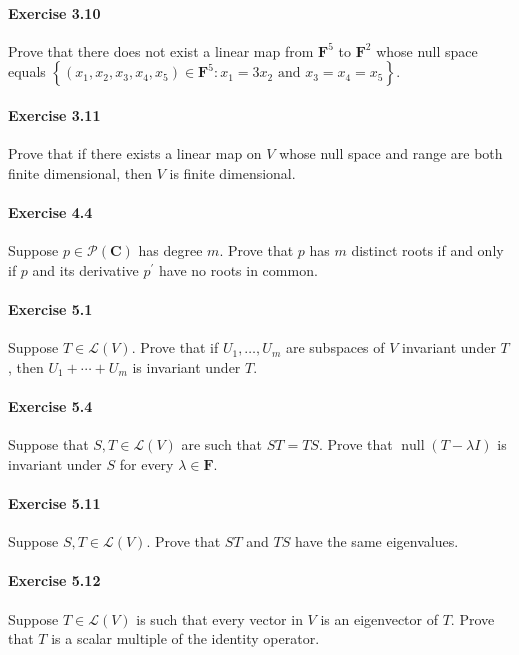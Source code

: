 \documentclass{article}
\begin{document}
\paragraph{Exercise 3.10} Prove that there does not exist a linear map from $\mathbf{F}^{5}$ to $\mathbf{F}^{2}$ whose null space equals $\left\{\left(x_{1}, x_{2}, x_{3}, x_{4}, x_{5}\right) \in \mathbf{F}^{5}: x_{1}=3 x_{2} \text { and } x_{3}=x_{4}=x_{5}\right\} .$

\paragraph{Exercise 3.11} Prove that if there exists a linear map on $V$ whose null space and range are both finite dimensional, then $V$ is finite dimensional.

\paragraph{Exercise 4.4} Suppose $p \in \mathcal{P}(\mathbf{C})$ has degree $m$. Prove that $p$ has $m$ distinct roots if and only if $p$ and its derivative $p^{\prime}$ have no roots in common.

\paragraph{Exercise 5.1} Suppose $T \in \mathcal{L}(V)$. Prove that if $U_{1}, \ldots, U_{m}$ are subspaces of $V$ invariant under $T$, then $U_{1}+\cdots+U_{m}$ is invariant under $T$.

\paragraph{Exercise 5.4} Suppose that $S, T \in \mathcal{L}(V)$ are such that $S T=T S$. Prove that $\operatorname{null} (T-\lambda I)$ is invariant under $S$ for every $\lambda \in \mathbf{F}$.

\paragraph{Exercise 5.11} Suppose $S, T \in \mathcal{L}(V)$. Prove that $S T$ and $T S$ have the same eigenvalues.

\paragraph{Exercise 5.12} Suppose $T \in \mathcal{L}(V)$ is such that every vector in $V$ is an eigenvector of $T$. Prove that $T$ is a scalar multiple of the identity operator.
\end{document}
